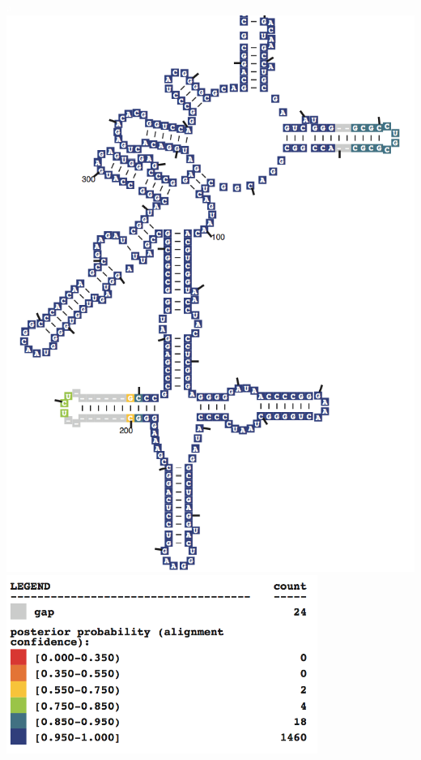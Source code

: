 \documentclass[landscape]{slides}
\begin{document}
\begin{slide}
\begin{center}
\textcolor{white}{a}
\vspace{4in}
\includegraphics[width=6in]{figs/M21529-archaea-indi-zoom1}
\includegraphics[width=4in]{figs/M21529-archaea-indi-zoom2}
\end{center}
\vfill
\end{slide}
\end{document}
